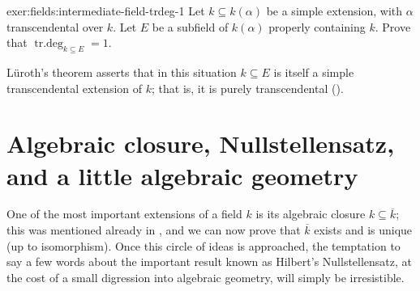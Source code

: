 \begin{exer}{}{exer:fields:intermediate-field-trdeg-1}
  Let $k \subseteq k(\alpha)$ be a simple extension, with $\alpha$
  transcendental over $k$. Let $E$ be a subfield of $k(\alpha)$
  properly containing $k$. Prove that
  $\operatorname{tr.deg}_{k \subseteq E} = 1$.

  L\"uroth's theorem asserts that in this situation $k \subseteq E$ is
  itself a simple transcendental extension of $k$; that is, it is
  purely transcendental
  ().
\end{exer}

\section{Algebraic closure, Nullstellensatz, and a little algebraic
  geometry}%
\label{sec:fields:algebraic-closure-nullstellensatz-and-a-little-algebraic}

One of the most important extensions of a field $k$ is its algebraic
closure $k \subseteq \overline{k}$; this was mentioned already in
, and
we can now prove that $\overline{k}$ exists and is unique (up to
isomorphism). Once this circle of ideas is approached, the temptation
to say a few words about the important result known as Hilbert's
Nullstellensatz, at the cost of a small digression into algebraic
geometry, will simply be irresistible.

